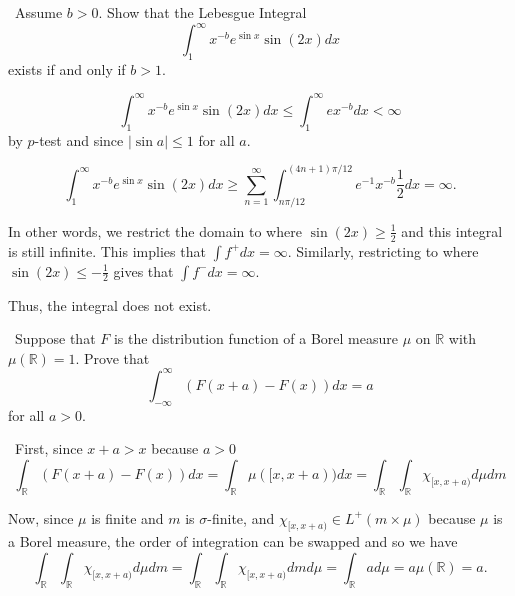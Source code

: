 \documentclass[12pt]{Homework}
\begin{document}
\begin{problem} $\,$
Assume $b>0$. Show that the Lebesgue Integral $$\int_1^\infty x^{-b}e^{\sin x}\sin(2x)dx$$ exists if and only if $b>1$.
\end{problem}


\begin{solution}$\,$
 $$\int_1^\infty x^{-b}e^{\sin x}\sin(2x)dx\le\int_1^\infty ex^{-b}dx<\infty$$ by $p$-test and since $|\sin a|\le1$ for all $a$.

 $$\int_1^\infty x^{-b}e^{\sin x}\sin(2x)dx\ge\sum_{n=1}^\infty\int_{n\pi/12}^{(4n+1)\pi/12} e^{-1}x^{-b}\frac{1}{2}dx=\infty.$$

In other words, we restrict the domain to where $\sin(2x)\ge\frac{1}{2}$ and this integral is still infinite. This implies that $\int f^+dx=\infty$. Similarly, restricting to where $\sin(2x)\le-\frac{1}{2}$ gives that $\int f^-dx=\infty$. 

Thus, the integral does not exist.
\end{solution}
\newpage

\begin{problem} $\,$
Suppose that $F$ is the distribution function of a Borel measure $\mu$ on $\mathbb{R}$ with $\mu(\mathbb{R})=1$. Prove that $$\int_{-\infty}^\infty(F(x+a)-F(x))dx=a$$ for all $a>0$.
\end{problem}


\begin{solution}$\,$
First, since $x+a>x$ because $a>0$
$$\int_\mathbb{R}(F(x+a)-F(x))dx=\int_\mathbb{R}\mu([x,x+a))dx=\int_\mathbb{R}\int_\mathbb{R}\chi_{[x,x+a)}d\mu dm$$

Now, since $\mu$ is finite and $m$ is $\sigma$-finite, and $\chi_{[x,x+a)}\in L^+(m\times\mu)$ because $\mu$ is a Borel measure, the order of integration can be swapped and so we have $$\int_\mathbb{R}\int_\mathbb{R}\chi_{[x,x+a)}d\mu dm=\int_\mathbb{R}\int_\mathbb{R}\chi_{[x,x+a)}dmd\mu=\int_\mathbb{R} ad\mu=a\mu(\mathbb{R})=a.$$
\end{solution}
\vspace{0.5cm}
\end{document}
